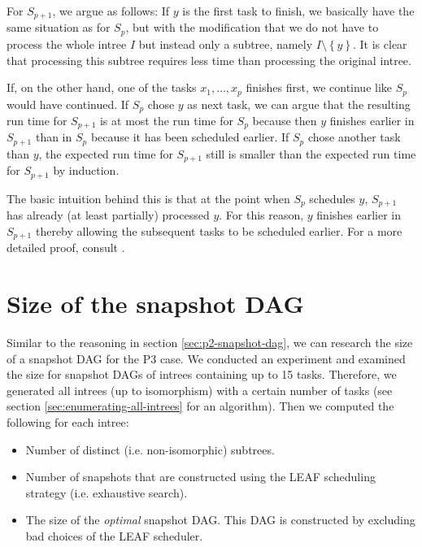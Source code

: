 
  
  For $S_{p+1}$, we argue as follows: If $y$ is the first task to finish, we basically have the same situation as for $S_p$, but with the modification that we do not have to process the whole intree $I$ but instead only a subtree, namely $I\setminus\left\{ y \right\}$. It is clear that processing this subtree requires less time than processing the original intree.

  If, on the other hand, one of the tasks $x_1,\dots,x_p$ finishes first, we continue like $S_p$ would have continued. If $S_p$ chose $y$ as next task, we can argue that the resulting run time for $S_{p+1}$ is at most the run time for $S_p$ because then $y$ finishes earlier in $S_{p+1}$ than in $S_p$ because it has been scheduled earlier. 
  If $S_p$ chose another task than $y$, the expected run time for $S_{p+1}$ still is smaller than the expected run time for $S_{p+1}$ by induction.

  The basic intuition behind this is that at the point when $S_p$ schedules $y$, $S_{p+1}$ has already (at least partially) processed $y$. For this reason, $y$ finishes earlier in $S_{p+1}$ thereby allowing the subsequent tasks to be scheduled earlier. For a more detailed proof, consult \cite{MoritzMaasDiploma}.

\section{Size of the snapshot DAG}
\label{sec:p3-size-of-snapshot-dag-first-attempts}

Similar to the reasoning in section \ref{sec:p2-snapshot-dag}, we can research the size of a snapshot DAG for the P3 case. 
We conducted an experiment and examined the size for snapshot DAGs of intrees containing up to 15 tasks. 
Therefore, we generated all intrees (up to isomorphism) with a certain number of tasks (see section \ref{sec:enumerating-all-intrees} for an algorithm).
Then we computed the following for each intree:
\begin{itemize}
\item Number of distinct (i.e. non-isomorphic) subtrees.
\item Number of snapshots that are constructed using the LEAF scheduling strategy (i.e. exhaustive search).
\item The size of the \emph{optimal} snapshot DAG. This DAG is constructed by excluding bad choices of the LEAF scheduler.
\end{itemize}

